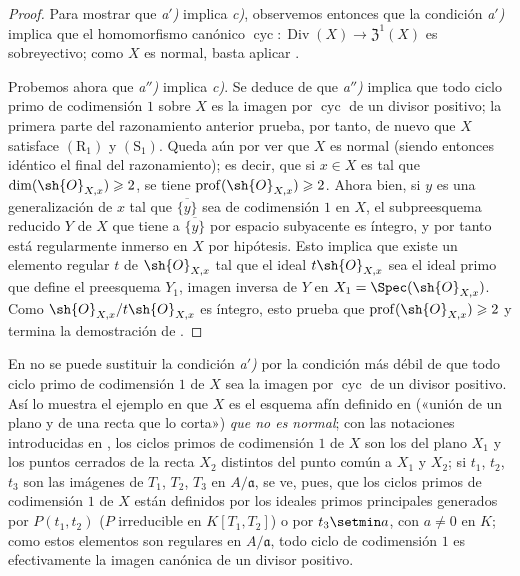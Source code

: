 \begin{proof}
Para mostrar que \emph{a$'$)} implica \emph{c)}, observemos entonces que la condición \emph{a$'$)} implica que el homomorfismo canónico $\operatorname{cyc}:\operatorname{Div}(X)\to\mathfrak{Z}^1(X)$ es sobreyectivo;
como $X$ es normal, basta aplicar .

Probemos ahora que \emph{a$''$)} implica \emph{c)}.
Se deduce de  que \emph{a$''$)} implica que todo ciclo primo de codimensión $1$ sobre $X$ es la imagen por $\operatorname{cyc}$ de un divisor positivo;
la primera parte del razonamiento anterior prueba, por tanto, de nuevo que $X$ satisface $(\mathrm{R}_1)$ y $(\mathrm{S}_1)$.
Queda aún por ver que $X$ es normal (siendo entonces idéntico el final del razonamiento); es decir, que si $x\in X$ es tal que $\dim(\sh{O}_{X,x})\geq2$, se tiene $\operatorname{prof}(\sh{O}_{X,x})\geq2$.
Ahora bien, si $y$ es una generalización de $x$ tal que $\overline{\{y\}}$ sea de codimensión $1$ en $X$, el subpreesquema reducido $Y$ de $X$ que tiene a $\overline{\{y\}}$ por espacio
subyacente es íntegro, y por tanto está regularmente inmerso en $X$ por hipótesis.
Esto implica que existe un elemento regular $t$ de $\sh{O}_{X,x}$ tal que el ideal $t\sh{O}_{X,x}$ sea el ideal primo que define el preesquema $Y_1$, imagen inversa de $Y$ en $X_1=\Spec(\sh{O}_{X,x})$.
Como $\sh{O}_{X,x}/t\sh{O}_{X,x}$ es íntegro, esto prueba que $\operatorname{prof}(\sh{O}_{X,x})\geq2$ y termina la demostración de .
\end{proof}

\begin{remark}[21.7.5]
\label{IV.21.7.5}
En  no se puede sustituir la condición \emph{a$'$)} por la condición más débil de que todo ciclo primo de codimensión $1$ de $X$ sea la imagen por $\operatorname{cyc}$ de un divisor positivo.
Así lo muestra el ejemplo en que $X$ es el esquema afín definido en  («unión de un plano y de una recta que lo corta») \emph{que no es normal};
con las notaciones introducidas en , los ciclos primos de codimensión $1$ de $X$ son los del plano $X_1$ y los puntos cerrados de la recta $X_2$ distintos del punto común a $X_1$ y $X_2$;
si $t_1$, $t_2$, $t_3$ son las imágenes de $T_1$, $T_2$, $T_3$ en $A/\mathfrak a$, se ve, pues, que los ciclos primos de codimensión $1$ de $X$ están definidos por los ideales primos principales generados por $P(t_1,t_2)$ ($P$ irreducible en $K[T_1,T_2]$) o por $t_3\setmin a$, con $a\neq0$ en $K$;
como estos elementos son regulares en $A/\mathfrak a$, todo ciclo de codimensión $1$ es efectivamente la imagen canónica de un divisor positivo.
\end{remark}

